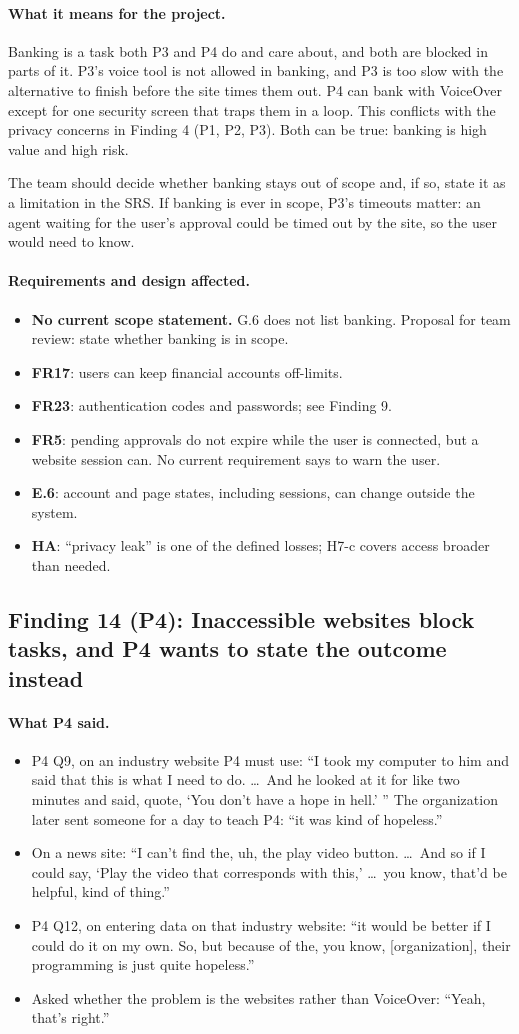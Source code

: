\documentclass[12pt, titlepage]{article}
\newcommand{\saidfour}{\paragraph{What P4 said.}}
\newcommand{\means}{\paragraph{What it means for the project.}}
\newcommand{\affects}{\paragraph{Requirements and design affected.}}
\begin{document}
\means
Banking is a task both P3 and P4 do and care about, and both are blocked in parts of it. P3's voice tool is not allowed in banking, and P3 is too slow with the alternative to finish before the site times them out. P4 can bank with VoiceOver except for one security screen that traps them in a loop. This conflicts with the privacy concerns in Finding 4 (P1, P2, P3). Both can be true: banking is high value and high risk.

The team should decide whether banking stays out of scope and, if so, state it as a limitation in the SRS. If banking is ever in scope, P3's timeouts matter: an agent waiting for the user's approval could be timed out by the site, so the user would need to know.

\affects
\begin{itemize}
    \item \textbf{No current scope statement.} G.6 does not list banking. Proposal for team review: state whether banking is in scope.
    \item \textbf{FR17}: users can keep financial accounts off-limits.
    \item \textbf{FR23}: authentication codes and passwords; see Finding 9.
    \item \textbf{FR5}: pending approvals do not expire while the user is connected, but a website session can. No current requirement says to warn the user.
    \item \textbf{E.6}: account and page states, including sessions, can change outside the system.
    \item \textbf{HA}: ``privacy leak'' is one of the defined losses; H7-c covers access broader than needed.
\end{itemize}

\subsection{Finding 14 (P4): Inaccessible websites block tasks, and P4 wants to state the outcome instead}

\saidfour
\begin{itemize}
    \item P4 Q9, on an industry website P4 must use: ``I took my computer to him and said that this is what I need to do. \ldots\ And he looked at it for like two minutes and said, quote, `You don't have a hope in hell.' '' The organization later sent someone for a day to teach P4: ``it was kind of hopeless.''
    \item On a news site: ``I can't find the, uh, the play video button. \ldots\ And so if I could say, `Play the video that corresponds with this,' \ldots\ you know, that'd be helpful, kind of thing.''
    \item P4 Q12, on entering data on that industry website: ``it would be better if I could do it on my own. So, but because of the, you know, [organization], their programming is just quite hopeless.''
    \item Asked whether the problem is the websites rather than VoiceOver: ``Yeah, that's right.''
\end{itemize}
\end{document}
